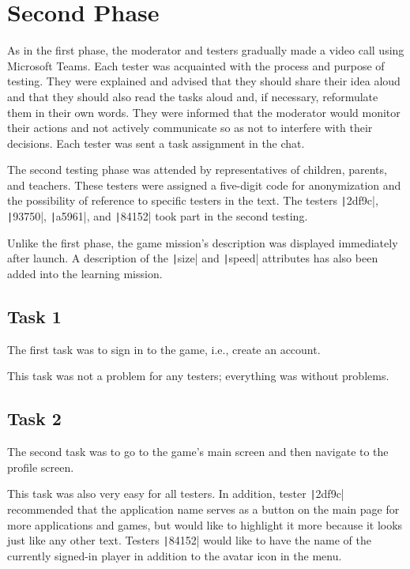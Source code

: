\section{Second Phase}

As in the first phase, the moderator and testers gradually made a video call using Microsoft Teams.
Each tester was acquainted with the process and purpose of testing.
They were explained and advised that they should share their idea aloud and that they should also read the tasks aloud and, if necessary, reformulate them in their own words.
They were informed that the moderator would monitor their actions and not actively communicate so as not to interfere with their decisions.
Each tester was sent a task assignment in the chat.

The second testing phase was attended by representatives of children, parents, and teachers.
These testers were assigned a five-digit code for anonymization and the possibility of reference to specific testers in the text.
The testers \texttt|2df9c|, \texttt|93750|, \texttt|a5961|, and \texttt|84152| took part in the second testing.

Unlike the first phase, the game mission's description was displayed immediately after launch.
A description of the \texttt|size| and \texttt|speed| attributes has also been added into the learning mission.

\subsection*{Task 1}

The first task was to sign in to the game, i.e., create an account.

This task was not a problem for any testers; everything was without problems.

\subsection*{Task 2}

The second task was to go to the game's main screen and then navigate to the profile screen.

This task was also very easy for all testers.
In addition, tester \texttt|2df9c| recommended that the application name serves as a button on the main page for more applications and games, but would like to highlight it more because it looks just like any other text.
Testers \texttt|84152| would like to have the name of the currently signed-in player in addition to the avatar icon in the menu.

